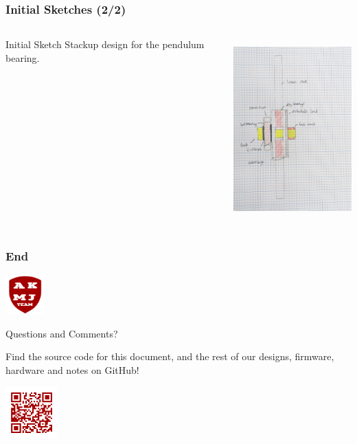\documentclass[aspectratio=169]{beamer}
\begin{document}
\begin{frame}
    \frametitle{Initial Sketches (2/2)}

    \begin{columns}
        \begin{column}{0.48\textwidth}
            \begin{block}{Initial Sketch}
                Stackup design for the pendulum bearing.
            \end{block}
        \end{column}
        \begin{column}{0.48\textwidth}
            \includegraphics[height=7cm]{../../Notes/Sketches/BearingStackup.jpg}
        \end{column}
    \end{columns}
\end{frame}


\begin{frame}
    \frametitle{End}

    \begin{center}
        \includegraphics[height=1.5cm]{../../AJMK_Logo}
    \end{center}


    \begin{block}{}
        \begin{center}
            \Huge Questions and Comments?
        \end{center}
    \end{block}

    \begin{center}
        Find the source code for this document, and the rest of our designs, firmware, hardware
        and notes on GitHub!

        \includegraphics[height=2cm]{github_qr}
    \end{center}

\end{frame}
\end{document}
